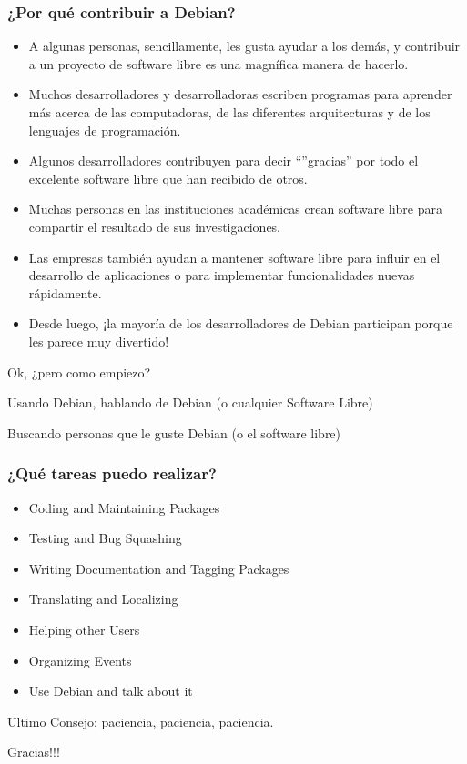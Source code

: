 \documentclass{beamer}
\begin{document}
\begin{frame}%
  \frametitle{¿Por qué contribuir a Debian?}
  \begin{itemize}
    \item A algunas personas, sencillamente, les gusta ayudar a los demás, y
      contribuir a un proyecto de software libre es una magnífica manera de
      hacerlo. \pause
    \item Muchos desarrolladores y desarrolladoras escriben programas para
      aprender más acerca de las computadoras, de las diferentes arquitecturas y
      de los lenguajes de programación. \pause
    \item Algunos desarrolladores contribuyen para decir ``''gracias'' por todo
      el excelente software libre que han recibido de otros. \pause
    \item Muchas personas en las instituciones académicas crean software libre
      para compartir el resultado de sus investigaciones. \pause
    \item Las empresas también ayudan a mantener software libre para influir en
      el desarrollo de aplicaciones o para implementar funcionalidades nuevas
      rápidamente. \pause
    \item Desde luego, ¡la mayoría de los desarrolladores de Debian participan
      porque les parece muy divertido!
  \end{itemize}
\end{frame}

\begin{frame}
 \centering
 \Huge Ok, ¿pero como empiezo?
\end{frame}

\begin{frame}
  \centering
  \Huge Usando Debian, hablando de Debian (o cualquier Software Libre)
\end{frame}

\begin{frame}
  \centering
  \Huge Buscando personas que le guste Debian (o el software libre)
\end{frame}

\begin{frame}
  \frametitle {¿Qué tareas puedo realizar?}
  \begin{itemize}
    \item Coding and Maintaining Packages \pause
    \item Testing and Bug Squashing \pause
    \item Writing Documentation and Tagging Packages \pause
    \item Translating and Localizing \pause
    \item Helping other Users \pause
    \item Organizing Events \pause
    \item Use Debian and talk about it
  \end{itemize}
\end{frame}

\begin{frame}
  \centering
  \huge Ultimo Consejo: paciencia, paciencia, paciencia.
\end{frame}

\begin{frame}
  \centering
  \Huge Gracias!!!
\end{frame}
\end{document}
